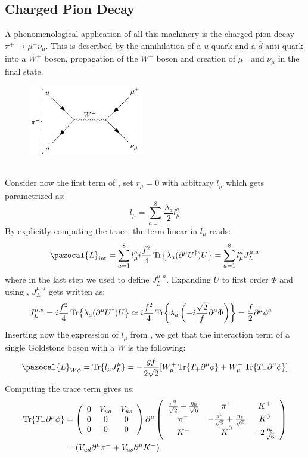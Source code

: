 \documentclass[../main.tex]{subfiles}
\begin{document}
\subsection{Charged Pion Decay}
A phenomenological application of all this machinery is the charged pion decay $\pi^+\to\mu^+\nu_\mu$. This is described by the annihilation of a $u$ quark and a $\overline{d}$ anti-quark into a $W^+$ boson, propagation of the $W^+$ boson and creation of $\mu^+$ and $\nu_\mu$ in the final state.
\begin{figure}[h]
    \centering\includegraphics[width=0.45\textwidth]{Images/piondecay.pdf}
    \caption*{}
\end{figure}\\
Consider now the first term of , set $r_\mu=0$ with arbitrary $l_\mu$ which gets parametrized as:
\[
l_\mu=\sum_{a=1}^8\frac{\lambda_a}{2}l_\mu^a
\]
By explicitly computing the trace, the term linear in $l_\mu$ reads:
\[
\pazocal{L}_{\text{int}}=\sum_{a=1}^8l_\mu^ai\frac{f^2}{4}\Tr{\lambda_a(\partial^\mu U^\dagger)U}=\sum_{a=1}^8l_\mu^aJ_L^{\mu,a}
\]
where in the last step we used  to define $J_L^{\mu,a}$. Expanding $U$ to first order $\Phi$ and using , $J_L^{\mu,a}$ gets written as:
\[
\begin{aligned}
J_L^{\mu,a}&=i\frac{f^2}{4}\Tr{\lambda_a(\partial^\mu U^\dagger)U}\simeq i\frac{f^2}{4}\Tr{\lambda_a\left(-i\frac{\sqrt{2}}{f}\partial^\mu\Phi\right)}=\frac{f}{2}\partial^\mu\phi^a
\end{aligned}
\]
Inserting now the expression of $l_\mu$ from , we get that the interaction term of a single Goldstone boson with a $W$ is the following:
\[
\pazocal{L}_{W\phi}=\Tr{l_\mu J^\mu_L}=-\frac{gf}{2\sqrt{2}}[W_\mu^+\Tr{T_+\partial^\mu\phi}+W_\mu^-\Tr{T_-\partial^\mu\phi}]
\]
Computing the trace term gives us:
\begin{align*}
\Tr{T_+\partial^\mu\phi}&=\left(\begin{array}{ccc}
    0 & V_{ud} & V_{us} \\
    0 & 0 & 0 \\
    0 & 0 & 0
\end{array}\right)\partial^\mu\left(\begin{array}{ccc}
    \frac{\pi^0}{\sqrt{2}}+\frac{\eta_8}{\sqrt{6}} & \pi^+ & K^+ \\
    \pi^- & -\frac{\pi^0}{\sqrt{2}}+\frac{\eta_8}{\sqrt{6}} & K^0 \\
    K^- & \overline{K}^0 & -2\frac{\eta_8}{\sqrt{6}} \\
\end{array}\right)\\
&=(V_{ud}\partial^\mu\pi^-+V_{us}\partial^\mu K^-)
\end{align*}
\end{document}
